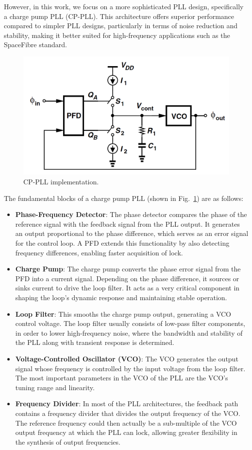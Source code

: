 \documentclass[lettersize,journal]{IEEEtran}
\begin{document}
However, in this work, we focus on a more sophisticated PLL design, specifically a charge pump PLL (CP-PLL). This architecture offers superior performance compared to simpler PLL designs, particularly in terms of noise reduction and stability, making it better suited for high-frequency applications such as the SpaceFibre standard.

\begin{figure}[!h]
    \centering
    \includegraphics[width=0.75\linewidth]{images/intro_system_level/pll_cp.png}
    \caption{CP-PLL implementation.}
    \label{fig:pll_cp}
\end{figure}

The fundamental blocks of a charge pump PLL (shown in Fig.~\ref{fig:pll_cp}) are as follows:

\begin{itemize}
    \item \textbf{Phase-Frequency Detector}: The phase detector compares the phase of the reference signal with the feedback signal from the PLL output. It generates an output proportional to the phase difference, which serves as an error signal for the control loop. A PFD extends this functionality by also detecting frequency differences, enabling faster acquisition of lock.
    \item \textbf{Charge Pump}: The charge pump converts the phase error signal from the PFD into a current signal. Depending on the phase difference, it sources or sinks current to drive the loop filter. It acts as a very critical component in shaping the loop's dynamic response and maintaining stable operation.
    \item \textbf{Loop Filter}: This smooths the charge pump output, generating a VCO control voltage. The loop filter usually consists of low-pass filter components, in order to lower high-frequency noise, where the bandwidth and stability of the PLL along with transient response is determined. 
    \item \textbf{Voltage-Controlled Oscillator (VCO)}: The VCO generates the output signal whose frequency is controlled by the input voltage from the loop filter. The most important parameters in the VCO of the PLL are the VCO's tuning range and linearity.
    \item \textbf{Frequency Divider}: In most of the PLL architectures, the feedback path contains a frequency divider that divides the output frequency of the VCO. The reference frequency could then actually be a sub-multiple of the VCO output frequency at which the PLL can lock, allowing greater flexibility in the synthesis of output frequencies.
\end{itemize}
\end{document}

